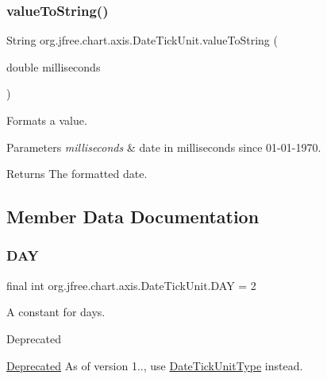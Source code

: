 \subsubsection{\texorpdfstring{value\+To\+String()}{valueToString()}}
{\footnotesize\ttfamily String org.\+jfree.\+chart.\+axis.\+Date\+Tick\+Unit.\+value\+To\+String (\begin{DoxyParamCaption}\item[{double}]{milliseconds }\end{DoxyParamCaption})}

Formats a value.


\begin{DoxyParams}{Parameters}
{\em milliseconds} & date in milliseconds since 01-\/01-\/1970.\\
\hline
\end{DoxyParams}
\begin{DoxyReturn}{Returns}
The formatted date. 
\end{DoxyReturn}


\subsection{Member Data Documentation}
\mbox{\label{classorg_1_1jfree_1_1chart_1_1axis_1_1_date_tick_unit_a86e8236f655aae09eb7ed58fcb522afd}} 
\subsubsection{\texorpdfstring{D\+AY}{DAY}}
{\footnotesize\ttfamily final int org.\+jfree.\+chart.\+axis.\+Date\+Tick\+Unit.\+D\+AY = 2\hspace{0.3cm}{\ttfamily [static]}}

A constant for days.

\begin{DoxyRefDesc}{Deprecated}
\item[\mbox{\hyperlink{deprecated__deprecated000008}{Deprecated}}]As of version 1.., use \mbox{\hyperlink{classorg_1_1jfree_1_1chart_1_1axis_1_1_date_tick_unit_type}{Date\+Tick\+Unit\+Type}} instead. \end{DoxyRefDesc}
\mbox{\label{classorg_1_1jfree_1_1chart_1_1axis_1_1_date_tick_unit_a7668877b64b0d6c95014b2884ee255c2}} 
